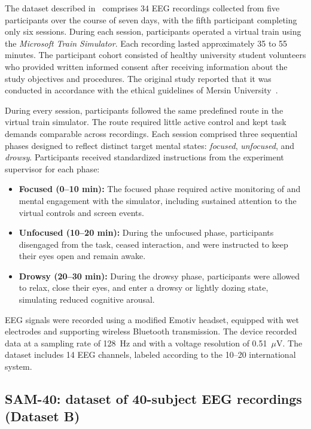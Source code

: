 \documentclass[10pt,letterpaper]{article}
\begin{document}
The dataset described in~\cite{aci2019attention} comprises 34 EEG recordings collected from five participants over the course of seven days, with the fifth participant completing only six sessions. During each session, participants operated a virtual train using the \textit{Microsoft Train Simulator}. Each recording lasted approximately 35 to 55 minutes. The participant cohort consisted of healthy university student volunteers who provided written informed consent after receiving information about the study objectives and procedures. The original study reported that it was conducted in accordance with the ethical guidelines of Mersin University~\cite{aci2019attention}.

During every session, participants followed the same predefined route in the virtual train simulator. The route required little active control and kept task demands comparable across recordings. Each session comprised three sequential phases designed to reflect distinct target mental states: \textit{focused}, \textit{unfocused}, and \textit{drowsy}. Participants received standardized instructions from the experiment supervisor for each phase:

\begin{itemize}
  \item \textbf{Focused (0--10 min):} The focused phase required active monitoring of and mental engagement with the simulator, including sustained attention to the virtual controls and screen events.
  \item \textbf{Unfocused (10--20 min):} During the unfocused phase, participants disengaged from the task, ceased interaction, and were instructed to keep their eyes open and remain awake.
  \item \textbf{Drowsy (20--30 min):} During the drowsy phase, participants were allowed to relax, close their eyes, and enter a drowsy or lightly dozing state, simulating reduced cognitive arousal.
\end{itemize}

EEG signals were recorded using a modified Emotiv headset, equipped with wet electrodes and supporting wireless Bluetooth transmission. The device recorded data at a sampling rate of 128~Hz and with a voltage resolution of 0.51~$\mu$V. The dataset includes 14 EEG channels, labeled according to the 10--20 international system.

\subsection*{SAM-40: dataset of 40-subject EEG recordings (Dataset B)}
\end{document}
